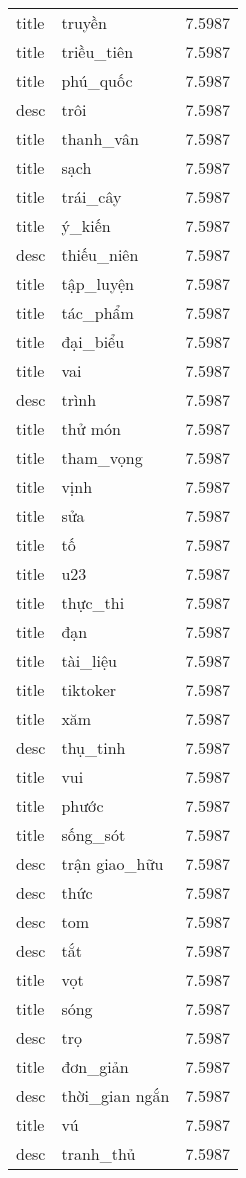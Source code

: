\documentclass{article}
\begin{document}
\begin{tabular}{lll}
title & truyền & 7.5987\\
title & triều\_tiên & 7.5987\\
title & phú\_quốc & 7.5987\\
desc & trôi & 7.5987\\
title & thanh\_vân & 7.5987\\
title & sạch & 7.5987\\
title & trái\_cây & 7.5987\\
title & ý\_kiến & 7.5987\\
desc & thiếu\_niên & 7.5987\\
title & tập\_luyện & 7.5987\\
title & tác\_phẩm & 7.5987\\
title & đại\_biểu & 7.5987\\
title & vai & 7.5987\\
desc & trình & 7.5987\\
title & thử món & 7.5987\\
title & tham\_vọng & 7.5987\\
title & vịnh & 7.5987\\
title & sửa & 7.5987\\
title & tố & 7.5987\\
title & u23 & 7.5987\\
title & thực\_thi & 7.5987\\
title & đạn & 7.5987\\
title & tài\_liệu & 7.5987\\
title & tiktoker & 7.5987\\
title & xăm & 7.5987\\
desc & thụ\_tinh & 7.5987\\
title & vui & 7.5987\\
title & phước & 7.5987\\
title & sống\_sót & 7.5987\\
desc & trận giao\_hữu & 7.5987\\
desc & thức & 7.5987\\
desc & tom & 7.5987\\
desc & tắt & 7.5987\\
title & vọt & 7.5987\\
title & sóng & 7.5987\\
desc & trọ & 7.5987\\
title & đơn\_giản & 7.5987\\
desc & thời\_gian ngắn & 7.5987\\
title & vú & 7.5987\\
desc & tranh\_thủ & 7.5987\\

\end{tabular}
\end{document}
